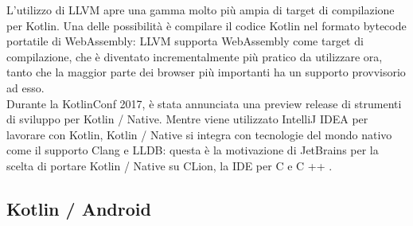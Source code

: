 L'utilizzo di LLVM apre una gamma molto più ampia di target di compilazione per Kotlin. Una delle possibilità è compilare il codice Kotlin nel formato bytecode portatile di WebAssembly: LLVM supporta WebAssembly come target di compilazione, che è diventato incrementalmente più pratico da utilizzare ora, tanto che la maggior parte dei browser più importanti ha un supporto provvisorio ad esso.\\
Durante la KotlinConf 2017, è stata annunciata una preview release di strumenti di sviluppo per Kotlin / Native. Mentre viene utilizzato IntelliJ IDEA per lavorare con Kotlin, Kotlin / Native si integra con tecnologie del mondo nativo come il supporto Clang e LLDB: questa è la motivazione di JetBrains per la scelta di portare Kotlin / Native su CLion, la IDE per C e C ++ \cite{kotlinNativeIDESupport}.\\

\subsection{Kotlin / Android}

